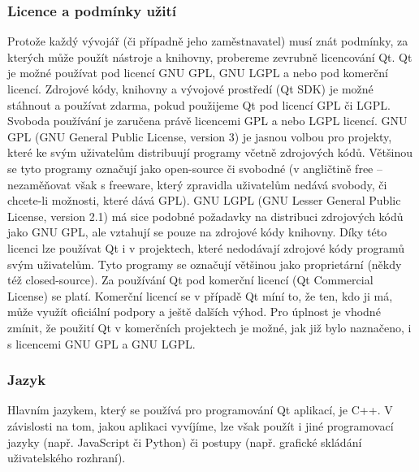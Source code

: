 \documentclass[a4paper,10pt]{article}
\begin{document}
\subsubsection{Licence a podmínky užití}
Protože každý vývojář (či případně jeho zaměstnavatel) musí znát podmínky, za kterých může použít nástroje a knihovny, probereme zevrubně licencování Qt.
Qt je možné používat pod licencí GNU GPL, GNU LGPL a nebo pod komerční licencí.
Zdrojové kódy, knihovny a vývojové prostředí (Qt SDK) je možné stáhnout a používat zdarma, pokud použijeme Qt pod licencí GPL či LGPL.
Svoboda používání je zaručena právě licencemi GPL a nebo LGPL licencí.
GNU GPL (GNU General Public License, version 3) je jasnou volbou pro projekty, které ke svým uživatelům distribuují programy včetně zdrojových kódů.
Většinou se tyto programy označují jako open-source či svobodné (v angličtině free -- nezaměňovat však s freeware, který zpravidla uživatelům nedává svobody, či chcete-li možnosti, které dává GPL).
GNU LGPL (GNU Lesser General Public License, version 2.1) má sice podobné požadavky na distribuci zdrojových kódů jako GNU GPL, ale vztahují se pouze na zdrojové kódy knihovny.
Díky této licenci lze používat Qt i v projektech, které nedodávají zdrojové kódy programů svým uživatelům.
Tyto programy se označují většinou jako proprietární (někdy též closed-source).
Za používání Qt pod komerční licencí (Qt Commercial License) se platí.
Komerční licencí se v případě Qt míní to, že ten, kdo ji má, může využít oficiální podpory a ještě dalších výhod.
Pro úplnost je vhodné zmínit, že použití Qt v komerčních projektech je možné, jak již bylo naznačeno, i s licencemi GNU GPL a GNU LGPL.



\subsubsection{Jazyk}
Hlavním jazykem, který se používá pro programování Qt aplikací, je C++.
V závislosti na tom, jakou aplikaci vyvíjíme, lze však použít i jiné programovací jazyky (např. JavaScript či Python) či postupy (např. grafické skládání uživatelského rozhraní).
\end{document}
